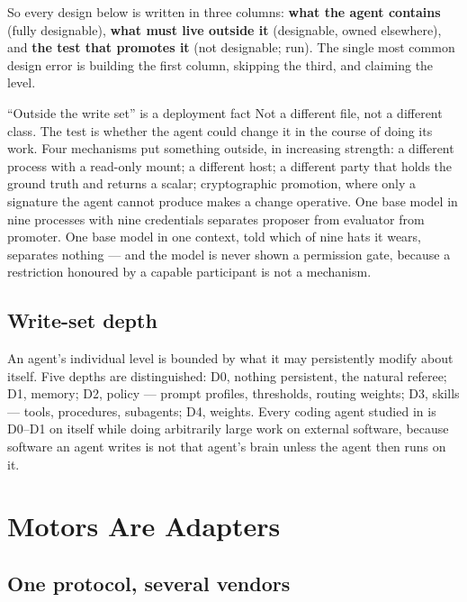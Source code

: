 \documentclass[11pt]{article}
\theoremstyle{definition}
\begin{document}
So every design below is written in three columns: \textbf{what the agent contains} (fully designable), \textbf{what must live outside it} (designable, owned elsewhere), and \textbf{the test that promotes it} (not designable; run). The single most common design error is building the first column, skipping the third, and claiming the level.

\begin{cautionbox}{``Outside the write set'' is a deployment fact}
Not a different file, not a different class. The test is whether the agent could change it in the course of doing its work. Four mechanisms put something outside, in increasing strength: a different process with a read-only mount; a different host; a different party that holds the ground truth and returns a scalar; cryptographic promotion, where only a signature the agent cannot produce makes a change operative. One base model in nine processes with nine credentials separates proposer from evaluator from promoter. One base model in one context, told which of nine hats it wears, separates nothing --- and the model is never shown a permission gate, because a restriction honoured by a capable participant is not a mechanism.
\end{cautionbox}

\subsection{Write-set depth}

An agent's individual level is bounded by what it may persistently modify about itself. Five depths are distinguished: D0, nothing persistent, the natural referee; D1, memory; D2, policy --- prompt profiles, thresholds, routing weights; D3, skills --- tools, procedures, subagents; D4, weights. Every coding agent studied in \citet{yang2026capability} is D0--D1 on itself while doing arbitrarily large work on external software, because software an agent writes is not that agent's brain unless the agent then runs on it.

\section{Motors Are Adapters}\label{sec:motors}

\subsection{One protocol, several vendors}
\end{document}
